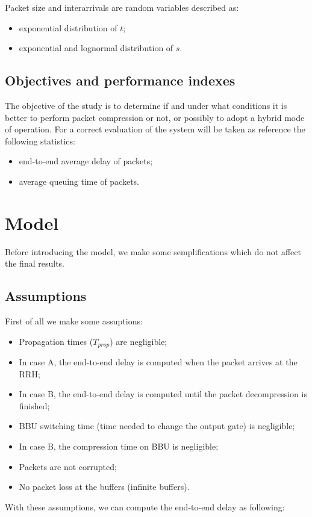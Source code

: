 \documentclass[11pt,a4paper,oneside, openright]{article}
\begin{document}
Packet size and interarrivals are random variables described as:
\begin{itemize}
	\item exponential distribution of $t$;
	\item exponential and lognormal distribution of $s$.
\end{itemize}

\subsection{Objectives and performance indexes}
The objective of the study is to determine if and under what conditions it is better to perform packet compression or not, or possibly to adopt a hybrid mode of operation.
For a correct evaluation of the system will be taken as reference the following statistics:
\begin{itemize}
	\item end-to-end average delay of packets;
	\item average queuing time of packets.
\end{itemize}

\section{Model}
Before introducing the model, we make some semplifications which do not affect the final results.
\subsection{Assumptions}
First of all we make some assuptions:
\begin{itemize}
    \item Propagation times ($ T_{prop} $) are negligible;
    \item In case A, the end-to-end delay is computed when the packet arrives at the RRH;
    \item In case B, the end-to-end delay is computed until the packet decompression is finished;
    \item BBU switching time (time needed to change the output gate) is negligible;
    \item In case B, the compression time on BBU is negligible;
    \item Packets are not corrupted;
    \item No packet loss at the buffers (infinite buffers).
\end{itemize}

With these assumptions, we can compute the end-to-end delay as following:
\end{document}
